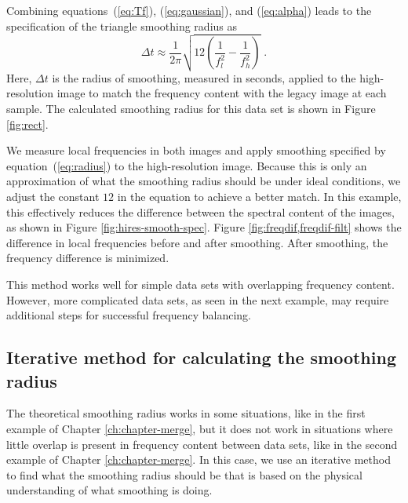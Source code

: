         Combining equations~(\ref{eq:Tf}), (\ref{eq:gaussian}), and (\ref{eq:alpha}) leads to the specification of the triangle smoothing radius as
        \begin{equation}
            \label{eq:radius}
            \Delta t \approx \frac{1}{2\pi}\sqrt{12\left(\frac{1}{f_{l}^{2}}-\frac{1}{f_{h}^{2}}\right)}\;.
        \end{equation}
        Here, $\Delta t$ is the radius of smoothing, measured in seconds, applied to the high-resolution image to match the frequency content with the legacy image at each sample. 
        The calculated smoothing radius for this data set is shown in Figure \ref{fig:rect}.
        
        
        We measure local frequencies in both images and apply smoothing specified by equation~(\ref{eq:radius}) to the high-resolution image.
        Because this is only an approximation of what the smoothing radius should be under ideal conditions, we adjust the constant $12$ in the equation to achieve a better match. 
        In this example, this effectively reduces the difference between the spectral content of the images, as shown in Figure \ref{fig:hires-smooth-spec}. 
        Figure \ref{fig:freqdif,freqdif-filt} shows the difference in local frequencies before and after smoothing. 
        After smoothing, the frequency difference is minimized. 
        
        This method works well for simple data sets with overlapping frequency content. 
        However, more complicated data sets, as seen in the next example, may require additional steps for successful frequency balancing.



        \subsection{Iterative method for calculating the smoothing radius}
        The theoretical smoothing radius works in some situations, like in the first example of Chapter \ref{ch:chapter-merge}, but it does not work in situations where little overlap is present in frequency content between data sets, like in the second example of Chapter \ref{ch:chapter-merge}.
        In this case, we use an iterative method to find what the smoothing radius should be that is based on the physical understanding of what smoothing is doing.

